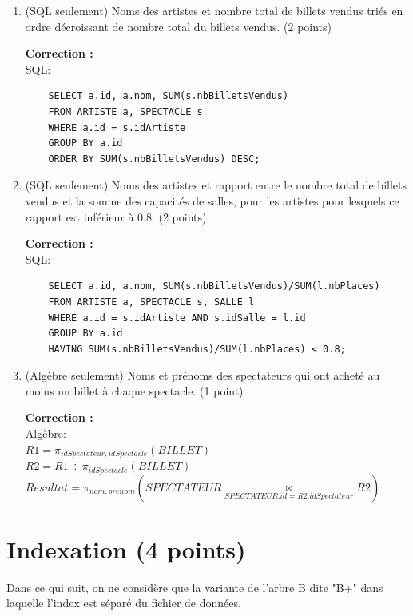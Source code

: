 \documentclass[10pt]{article}
\newenvironment{solution}{\vspace{6pt}\noindent\color{red}\textbf{Correction : }}{\vspace{6pt}\ignorespacesafterend}
\begin{document}
\begin{enumerate}
\item (SQL seulement) Noms des artistes et nombre total de billets vendus triés en ordre décroissant de nombre total du billets vendus. (2 points)

\begin{solution}\\
SQL:
\begin{verbatim}
    SELECT a.id, a.nom, SUM(s.nbBilletsVendus)
    FROM ARTISTE a, SPECTACLE s
    WHERE a.id = s.idArtiste
    GROUP BY a.id
    ORDER BY SUM(s.nbBilletsVendus) DESC;
\end{verbatim}
\end{solution}

\item (SQL seulement) Noms des artistes et rapport entre le nombre total de billets vendus et la somme des capacités de salles, pour les artistes pour lesquels ce rapport est inférieur à 0.8. (2 points)

\begin{solution}\\
SQL:
\begin{verbatim}
    SELECT a.id, a.nom, SUM(s.nbBilletsVendus)/SUM(l.nbPlaces)
    FROM ARTISTE a, SPECTACLE s, SALLE l
    WHERE a.id = s.idArtiste AND s.idSalle = l.id
    GROUP BY a.id
    HAVING SUM(s.nbBilletsVendus)/SUM(l.nbPlaces) < 0.8;
\end{verbatim}
\end{solution}

\item (Algèbre seulement) Noms et prénoms des spectateurs qui ont acheté au moins un billet à chaque spectacle. (1 point)

\begin{solution}\\
Algèbre:\\
    $R1 = \pi_{idSpectateur, idSpectacle} (BILLET)$\\
    $R2 = R1 \div \pi_{idSpectacle}(BILLET)$\\
    $Resultat = \pi_{nom, prenom}(SPECTATEUR \underset{SPECTATEUR.id=R2.idSpectateur}{\bowtie} R2)$
\end{solution}


\end{enumerate}

\section{Indexation (4 points)}

Dans ce qui suit, on ne considère que la variante de l'arbre B dite "B+"  dans laquelle
l'index est séparé du fichier de données.
\end{document}
